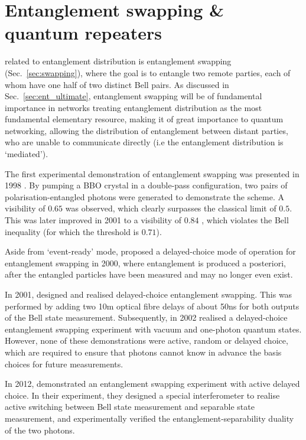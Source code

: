 %
%

\section{Entanglement swapping \& quantum repeaters}  

 related to entanglement distribution is entanglement swapping (Sec.~\ref{sec:swapping}), where the goal is to entangle two remote parties, each of whom have one half of two distinct Bell pairs. As discussed in Sec.~\ref{sec:ent_ultimate}, entanglement swapping will be of fundamental importance in networks treating entanglement distribution as the most fundamental elementary resource, making it of great importance to quantum networking, allowing the distribution of entanglement between distant parties, who are unable to communicate directly (i.e the entanglement distribution is `mediated').

The first experimental demonstration of entanglement swapping was presented in 1998 \cite{bib:PRL_80_3891}. By pumping a BBO crystal in a double-pass configuration, two pairs of polarisation-entangled photons were generated to demonstrate the scheme. A visibility of \mbox{$0.65$} was observed, which clearly surpasses the classical limit of \mbox{$0.5$}. This was later improved in 2001 to a visibility of \mbox{$0.84$} \cite{bib:PRL_86_4435}, which violates the Bell inequality (for which the threshold is $0.71$). 

Aside from `event-ready' mode, \cite{bib:JMO_47_2} proposed a delayed-choice mode of operation for entanglement swapping in 2000, where entanglement is produced a posteriori, after the entangled particles have been measured and may no longer even exist.

In 2001, \cite{bib:PRL_88_017903} designed and realised delayed-choice entanglement swapping. This was performed by adding two 10m optical fibre delays of about 50ns for both outputs of the Bell state measurement. Subsequently, in 2002 \cite{bib:PRA_66_024309} realised a delayed-choice entanglement swapping experiment with vacuum and one-photon quantum states. However, none of these demonstrations were active, random or delayed choice, which are required to ensure that photons cannot know in advance the basis choices for future measurements.

In 2012, \cite{bib:Nat_Phys_8_479} demonstrated an entanglement swapping experiment with active delayed choice. In their experiment, they designed a special interferometer to realise active switching between Bell state measurement and separable state measurement, and experimentally verified the entanglement-separability duality of the two photons. 

